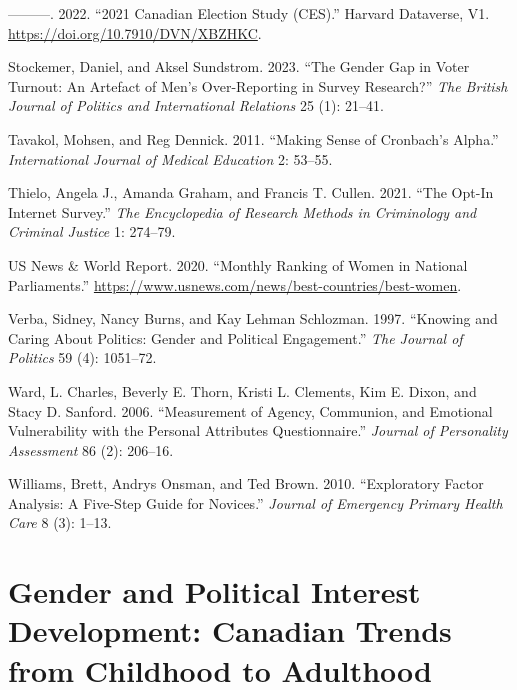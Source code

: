 \documentclass[
  letterpaper,
  DIV=11,
  numbers=noendperiod]{scrreprt}
\newlength{\cslhangindent}
\newlength{\cslentryspacingunit} %
\newenvironment{CSLReferences}[2] %
 {%
  \setlength{\parindent}{0pt}
  \ifodd #1
  \let\oldpar\par
  \def\par{\hangindent=\cslhangindent\oldpar}
  \fi
  \setlength{\parskip}{#2\cslentryspacingunit}
 }%
 {}
\begin{document}
\begin{CSLReferences}{1}{0}
\leavevmode{}%
---------. 2022. {``{2021 Canadian Election Study (CES)}.''} Harvard
Dataverse, V1. \url{https://doi.org/10.7910/DVN/XBZHKC}.

\leavevmode{}%
Stockemer, Daniel, and Aksel Sundstrom. 2023. {``{The Gender Gap in
Voter Turnout: An Artefact of Men's Over-Reporting in Survey
Research?}''} \emph{The British Journal of Politics and International
Relations} 25 (1): 21--41.

\leavevmode{}%
Tavakol, Mohsen, and Reg Dennick. 2011. {``{Making Sense of Cronbach's
Alpha}.''} \emph{International Journal of Medical Education} 2: 53--55.

\leavevmode{}%
Thielo, Angela J., Amanda Graham, and Francis T. Cullen. 2021. {``{The
Opt-In Internet Survey}.''} \emph{The Encyclopedia of Research Methods
in Criminology and Criminal Justice} 1: 274--79.

\leavevmode{}%
US News \& World Report. 2020. {``{Monthly Ranking of Women in National
Parliaments}.''}
\url{https://www.usnews.com/news/best-countries/best-women}.

\leavevmode{}%
Verba, Sidney, Nancy Burns, and Kay Lehman Schlozman. 1997. {``{Knowing
and Caring About Politics: Gender and Political Engagement}.''}
\emph{The Journal of Politics} 59 (4): 1051--72.

\leavevmode{}%
Ward, L. Charles, Beverly E. Thorn, Kristi L. Clements, Kim E. Dixon,
and Stacy D. Sanford. 2006. {``{Measurement of Agency, Communion, and
Emotional Vulnerability with the Personal Attributes Questionnaire}.''}
\emph{Journal of Personality Assessment} 86 (2): 206--16.

\leavevmode{}%
Williams, Brett, Andrys Onsman, and Ted Brown. 2010. {``{Exploratory
Factor Analysis: A Five-Step Guide for Novices}.''} \emph{Journal of
Emergency Primary Health Care} 8 (3): 1--13.

\end{CSLReferences}


\hypertarget{sec-chap3}{%
\chapter{Gender and Political Interest Development: Canadian Trends from
Childhood to Adulthood}\label{sec-chap3}}
\end{document}
